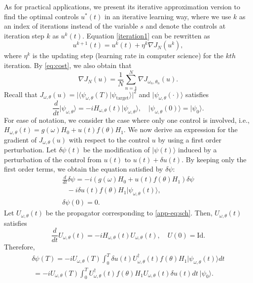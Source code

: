 \documentclass[letterpaper, 10 pt, conference]{ieeeconf}
\begin{document}
As for practical applications, we present its iterative
approximation version to find the optimal controls $u^*(t)$ in an
iterative learning way, where we use $k$ as an index of iterations
instead of the variable $s$ and denote the controls at iteration
step $k$ as $u^{k}(t)$.
Equation \eqref{iteration1} can be rewritten as
\begin{equation}\label{iteration2}
u^{k+1}(t)=u^{k}(t)+ \eta^{k}\nabla J_N(u^{k}),
\end{equation}
where $\eta^{k}$ is the updating step (learning rate in computer
science) for the $kth$ iteration. By \eqref{eq:cost}, we also obtain that
\begin{equation}
\nabla J_N(u)=\frac{1}{N}\sum_{n=1}^{N}\nabla J_{\omega_n,\theta_n}(u).
\end{equation}
Recall that $J_{\omega,\theta}(u)=\vert \langle\psi_{\omega,\theta}(T)\vert\psi_{\textrm{target}}\rangle\vert^2$ and $\vert\psi_{\omega,\theta}(\cdot)\rangle$ satisfies
\begin{equation}\label{app-eq:sch}
\frac{d}{dt}\vert\psi_{\omega,\theta}\rangle=-iH_{\omega,\theta}(t)\vert\psi_{\omega,\theta}\rangle,\quad \vert\psi_{\omega,\theta}(0)\rangle=\vert\psi_{0}\rangle.
\end{equation} For ease of notation, we consider the case where only one control is involved, i.e., $H_{\omega,\theta}(t)=g(\omega)H_0+u(t)f(\theta)H_1$. We now derive an expression for the gradient of $J_{\omega,\theta}(u)$ with respect to the control $u$ by using a first order perturbation. Let $\delta\psi(t)$ be the modification of $\vert \psi(t)\rangle$ induced by a perturbation of the control from $u(t)$ to $u(t)+\delta u(t)$.
By keeping only the first order terms, we obtain the equation satisfied by $\delta\psi$:
\begin{eqnarray*}
\frac{d}{dt}\delta\psi=-i\left(g(\omega)H_0+u(t)f(\theta)H_1\right)\delta\psi\\
\ \ \  -i\delta u(t)f(\theta)H_1\vert\psi_{\omega,\theta}(t)\rangle,\ \ \ \ \ \ \ \\
\delta\psi(0)=0. \ \ \ \ \ \ \ \  \ \ \ \ \ \ \ \ \ \ \ \ \ \ \ \ \ \ \ \ \ \ \ \
\end{eqnarray*} Let $U_{\omega,\theta}(t)$ be the propagator corresponding to \eqref{app-eq:sch}. Then, $U_{\omega,\theta}(t)$ satisfies
$$\frac{d}{dt}U_{\omega,\theta}(t)=-iH_{\omega,\theta}(t)U_{\omega,\theta}(t),\quad U(0)=\textrm{Id}.$$
Therefore,
\begin{eqnarray}
\delta\psi(T)=-iU_{\omega,\theta}(T)\int_0^T\delta u(t)U_{\omega,\theta}^\dagger(t)f(\theta)H_1\vert\psi_{\omega,\theta}(t)\rangle dt\nonumber \\
\ =-iU_{\omega,\theta}(T)\int_0^TU_{\omega,\theta}^\dagger(t)f(\theta)H_1U_{\omega,\theta}(t) \delta u(t)dt~ \vert\psi_0\rangle.\label{app-eq:deltapsi}
\end{eqnarray}
\end{document}
